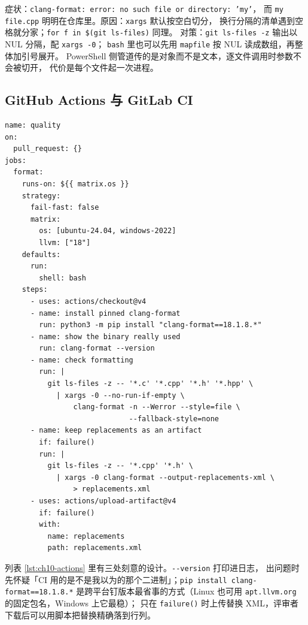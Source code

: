 \documentclass[12pt,a4paper,fontset=fandol]{ctexbook}
\newcommand{\Opt}[1]{\texttt{-\/-#1}}
\begin{document}
\begin{note}[title={文件名含空格时为什么必须 \texttt{-z} 配 \texttt{xargs -0}}]
  症状：\texttt{clang-format: error: no such file or directory: 'my'}，
  而 \texttt{my file.cpp} 明明在仓库里。原因：\texttt{xargs} 默认按空白切分，
  换行分隔的清单遇到空格就分家；\texttt{for f in \$(git ls-files)} 同理。
  对策：\texttt{git ls-files -z} 输出以 NUL 分隔，配 \texttt{xargs -0}；
  \texttt{bash} 里也可以先用 \texttt{mapfile} 按 NUL 读成数组，再整体加引号展开。
  PowerShell 侧管道传的是对象而不是文本，逐文件调用时参数不会被切开，
  代价是每个文件起一次进程。
\end{note}

\subsection{GitHub Actions 与 GitLab CI}\label{sec:ch10-s5-actions}

\begin{lstlisting}[style=yamlstyle,caption={矩阵化的格式化门禁（GitHub Actions）},label={lst:ch10-actions}]
name: quality
on:
  pull_request: {}
jobs:
  format:
    runs-on: ${{ matrix.os }}
    strategy:
      fail-fast: false
      matrix:
        os: [ubuntu-24.04, windows-2022]
        llvm: ["18"]
    defaults:
      run:
        shell: bash
    steps:
      - uses: actions/checkout@v4
      - name: install pinned clang-format
        run: python3 -m pip install "clang-format==18.1.8.*"
      - name: show the binary really used
        run: clang-format --version
      - name: check formatting
        run: |
          git ls-files -z -- '*.c' '*.cpp' '*.h' '*.hpp' \
            | xargs -0 --no-run-if-empty \
                clang-format -n --Werror --style=file \
                             --fallback-style=none
      - name: keep replacements as an artifact
        if: failure()
        run: |
          git ls-files -z -- '*.cpp' '*.h' \
            | xargs -0 clang-format --output-replacements-xml \
                > replacements.xml
      - uses: actions/upload-artifact@v4
        if: failure()
        with:
          name: replacements
          path: replacements.xml
\end{lstlisting}

列表 \ref{lst:ch10-actions} 里有三处刻意的设计。\Opt{version} 打印进日志，
出问题时先怀疑「CI 用的是不是我以为的那个二进制」；\texttt{pip install
clang-format==18.1.8.*} 是跨平台钉版本最省事的方式（Linux 也可用
\texttt{apt.llvm.org} 的固定包名，Windows 上它最稳）；
只在 \texttt{failure()} 时上传替换 XML，评审者下载后可以用脚本把替换精确落到行列。
\end{document}
